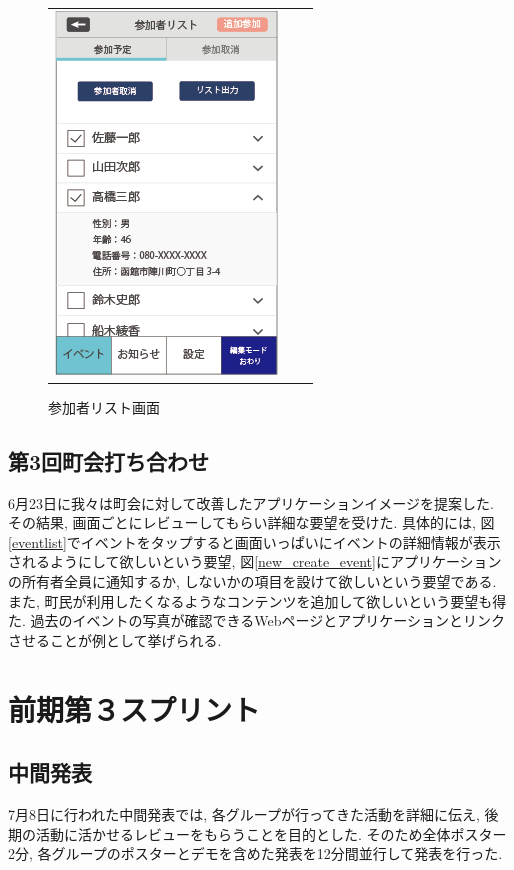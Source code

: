 \begin{figure}[h]
\begin{tabular}{ccc}
\begin{minipage}[t]{0.3\hsize}
      \end{minipage}
      \begin{minipage}[t]{0.3\hsize}
        \centering
        \includegraphics[keepaspectratio, scale=0.5]{process_figures/joinlist.png}
        \caption{参加者リスト画面}
        \label{joinedlist}
      \end{minipage}
    \end{tabular}
\end{figure}

\subsection{第3回町会打ち合わせ}
6月23日に我々は町会に対して改善したアプリケーションイメージを提案した.
その結果, 画面ごとにレビューしてもらい詳細な要望を受けた.
具体的には, 図\ref{eventlist}でイベントをタップすると画面いっぱいにイベントの詳細情報が表示されるようにして欲しいという要望,
図\ref{new_create_event}にアプリケーションの所有者全員に通知するか, しないかの項目を設けて欲しいという要望である.
また, 町民が利用したくなるようなコンテンツを追加して欲しいという要望も得た.
過去のイベントの写真が確認できるWebページとアプリケーションとリンクさせることが例として挙げられる.

\section{前期第３スプリント}

\subsection{中間発表}
7月8日に行われた中間発表では, 各グループが行ってきた活動を詳細に伝え, 後期の活動に活かせるレビューをもらうことを目的とした.
そのため全体ポスター2分, 各グループのポスターとデモを含めた発表を12分間並行して発表を行った.

